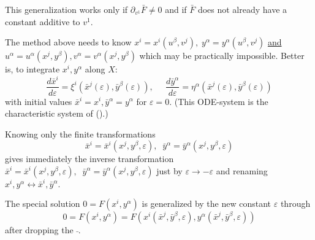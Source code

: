 This generalization works only if $\partial_{v^1}\bar{F} \neq 0$ and
if $\bar{F}$ does not already have
a constant additive to $v^1$.

The method above needs to know $x^i=x^i(u^\beta,v^j),\;
y^\alpha=y^\alpha(u^\beta,v^j)$ \underline{and}
$u^\alpha = u^\alpha(x^j,y^\beta), v^\alpha = v^\alpha(x^j,y^\beta)$
which may be practically impossible.
Better is, to integrate $x^i,y^\alpha$ along $X$:
\begin{equation}
\frac{d\bar{x}^i}{d\varepsilon} = \xi^i(\bar{x}^j(\varepsilon),
                                  \bar{y}^\beta(\varepsilon)), \;\;\;\;\;
\frac{d\bar{y}^\alpha}{d\varepsilon} = \eta^\alpha(\bar{x}^j(\varepsilon),
                                       \bar{y}^\beta(\varepsilon))
\label{ODEsys}
\end{equation}
with initial values $\bar{x}^i = x^i, \bar{y}^\alpha = y^\alpha$
for $\varepsilon = 0.$
(This ODE-system is the characteristic system of ().)

Knowing only the finite transformations
\begin{equation}
\bar{x}^i = \bar{x}^i(x^j,y^\beta,\varepsilon),\;\;
\bar{y}^\alpha = \bar{y}^\alpha(x^j,y^\beta,\varepsilon)  \label{ODEsol}
\end{equation}
gives immediately the inverse transformation
$\bar{x}^i = \bar{x}^i(x^j,y^\beta,\varepsilon),\;\;
\bar{y}^\alpha = \bar{y}^\alpha(x^j,y^\beta,\varepsilon)$
just by $\varepsilon \rightarrow -\varepsilon$ and renaming
$x^i,y^\alpha \leftrightarrow \bar{x}^i,\bar{y}^\alpha.$

The special solution $0 = F(x^i,y^\alpha)$
is generalized by the new constant
$\varepsilon$ through
\[ 0 = F(x^i,y^\alpha) = F(x^i(\bar{x}^j,\bar{y}^\beta,\varepsilon),
                  y^\alpha(\bar{x}^j,\bar{y}^\beta,\varepsilon)) \]
after dropping the $\bar{~}$.

